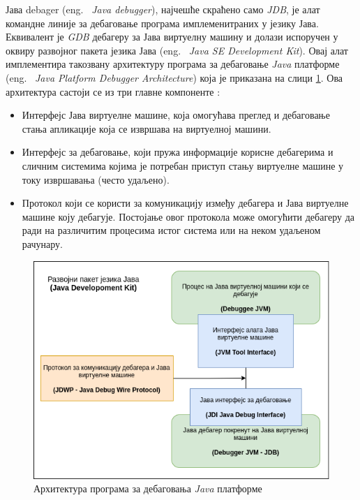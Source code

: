 \documentclass[a4paper]{article}
\begin{document}
Јава debager (eng. ~{\em Java debugger}), најчешће скраћено само {\em JDB}, је алат командне линије 
за дебаговање програма имплеменитраних у језику Јава.
Еквивалент је {\em GDB} дебагеру за Јава виртуелну машину и долази испоручен у оквиру
развојног пакета језика Јава (eng. ~{\em Java SE Development Kit}).
Овај алат имплементира такозвану архитектуру програма за дебаговање
{\em Java} платформе (eng. ~{\em Java Platform Debugger Architecture}) која је приказана на слици \ref{fig:jdb}.
Ова архитектура састоји се из три главне компоненте \cite{oracle}:
\begin{itemize}
 \item Интерфејс Јава виртуелне машине, која омогућава преглед и
 дебаговање стања апликације која се извршава на виртуелној машини.
 \item Интерфејс за дебаговање, који пружа информације корисне дебагерима
 и сличним системима којима је потребан приступ стању виртуелне машине у 
 току извршавања (често удаљено).
 \item Протокол који се користи за комуникацију између дебагера и Јава
 виртуелне машине коју дебагује. Постојање овог протокола може омогућити
 дебагеру да ради на различитим процесима истог система или на неком удаљеном
 рачунару.
\end{itemize}

\begin{figure}
    \begin{center}
        \includegraphics[width=\textwidth]{slike/javajdb.png}
    \end{center}
    \caption{Архитектура програма за дебаговања {\em Java} платформе}
    \label{fig:jdb}
\end{figure}
\end{document}
